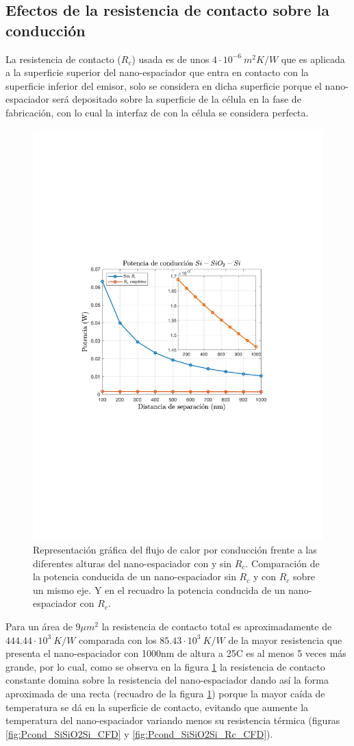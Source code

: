\subsection{Efectos de la resistencia de contacto sobre la conducción}
La resistencia de contacto ($R_c$) usada es de unos $4\cdot 10^{-6} \ m^2 K/W$ \cite{nf_TPV_Pillars_SiO2} que es aplicada a la superficie superior del nano-espaciador que entra en contacto con la superficie inferior del emisor, solo se considera en dicha superficie porque el nano-espaciador será depositado sobre la superficie de la célula en la fase de fabricación, con lo cual la interfaz de con la célula se considera perfecta.
\begin{figure}[H]
	\centering
		\includegraphics[width=.55\textwidth]{figuras/Resultados/conduccion/pdf/PrcComb2PDF_SiSiO2Si}
	\caption[Efectos de la resistencia de contacto sobre el flujo de calor por conducción]{Representación gráfica del flujo de calor por conducción frente a las diferentes alturas del nano-espaciador con y sin $R_c$. Comparación de la potencia conducida de un nano-espaciador sin $R_c$ y con $R_c$ sobre un mismo eje. Y en el recuadro la potencia conducida de un nano-espaciador con $R_c$.}
	\label{fig:PcondRc_SiSiO2Si}
\end{figure}
Para un área de 9$\mu m^2$ la resistencia de contacto total es aproximadamente de $444.44\cdot 10^3 \ K/W$ comparada con los $85.43\cdot 10^3 \ K/W$ de la mayor resistencia que presenta el nano-espaciador con 1000nm de altura a 25\textdegree C es al menos 5 veces más grande, por lo cual, como se observa en la figura \ref{fig:PcondRc_SiSiO2Si} la resistencia de contacto constante domina sobre la resistencia del nano-espaciador dando así la forma aproximada de una recta (recuadro de la figura \ref{fig:PcondRc_SiSiO2Si}) porque la mayor caída de temperatura se dá en la superficie de contacto, evitando que aumente la temperatura del nano-espaciador variando menos su resistencia térmica (figuras \ref{fig:Pcond_SiSiO2Si_CFD} y \ref{fig:Pcond_SiSiO2Si_Rc_CFD}).
